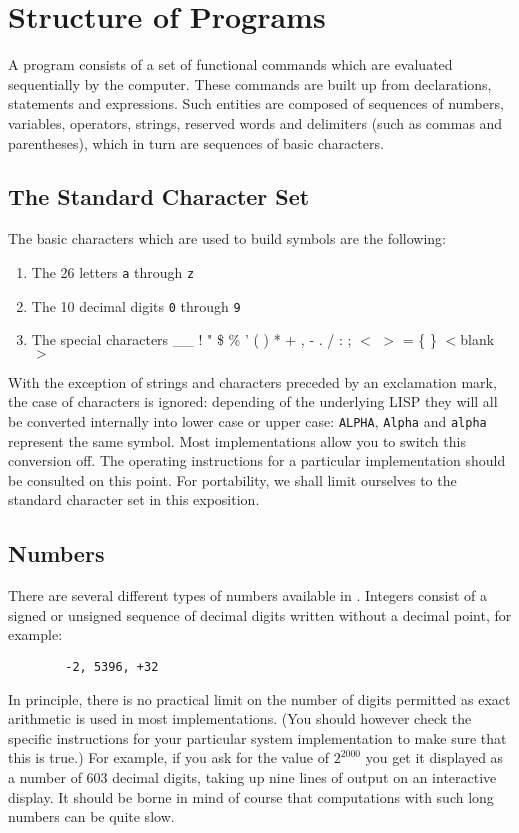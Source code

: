 \chapter{Structure of Programs}

A {\REDUCE} program consists of a set of
functional commands which are evaluated sequentially by the computer.
These commands are built up from declarations, statements and expressions.
Such entities are composed of sequences of numbers, variables, operators,
strings, reserved words and delimiters (such as commas and parentheses),
which in turn are sequences of basic characters.

\section{The {\REDUCE} Standard Character Set}

The basic characters which are used to build
{\REDUCE} symbols are the following:
\begin{enumerate}
\item The 26 letters {\tt a} through {\tt z}
\item The 10 decimal digits {\tt 0} through {\tt 9}
\item The special characters \_\_ ! " \$ \% ' ( ) * + , - . / : ; $<$ $>$
      = \{ \} $<$blank$>$
\end{enumerate}
With the exception of strings and characters preceded by an
exclamation mark, the case
of characters is ignored: depending of the underlying LISP
they will all be converted internally into lower case or
upper case: {\tt ALPHA}, {\tt Alpha} and {\tt alpha}
represent the same symbol.  Most implementations allow you to switch
this conversion off. The operating instructions for a particular
implementation should be consulted on this point. For portability, we
shall limit ourselves to the standard character set in this exposition.

\section{Numbers}

There are several different types of numbers available in
\REDUCE.  Integers consist of a signed or unsigned sequence of decimal
digits written without a decimal point, for example:
\begin{verbatim}
        -2, 5396, +32
\end{verbatim}
In principle, there is no practical limit on the number of digits
permitted as exact arithmetic is used in most implementations. (You should
however check the specific instructions for your particular system
implementation to make sure that this is true.) For example, if you ask
for the value of $2^{2000}$ you get it
displayed as a number of 603 decimal digits, taking up nine lines of
output on an interactive display.  It should be borne in mind of course
that computations with such long numbers can be quite slow.

